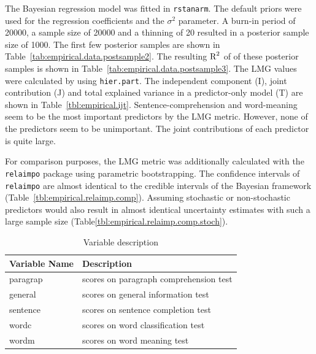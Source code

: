 \documentclass[11pt,a4paper,twoside]{book}\usepackage[]{graphicx}\usepackage[]{color}
\begin{document}
The Bayesian regression model was fitted in \texttt{rstanarm}. The default priors were used for the regression coefficients and the $\sigma^2$ parameter. A burn-in period of 20000, a sample size of 20000 and a thinning of 20 resulted in a posterior sample size of 1000. The first few posterior samples are shown in Table~\ref{tab:empirical.data.postsample2}. The resulting $\text{R}^2$ of of these posterior samples is shown in Table~\ref{tab:empirical.data.postsample3}. The LMG values were calculated by using \texttt{hier.part}. The  independent component (I), joint contribution (J) and total explained variance in a predictor-only model (T) are shown in Table~\ref{tbl:empirical.ijt}. Sentence-comprehension and word-meaning seem to be the most important predictors by the LMG metric. However, none of the predictors seem to be unimportant.  The joint contributions of each predictor is quite large.

For comparison purposes, the LMG metric was additionally calculated with the \texttt{relaimpo} package using parametric bootstrapping. The confidence intervals of  \texttt{relaimpo} are almost identical to the credible intervals of the Bayesian framework (Table~\ref{tbl:empirical.relaimp.comp}). Assuming stochastic or non-stochastic predictors would also result in almost identical uncertainty estimates with such a large sample size (Table\ref{tbl:empirical.relaimp.comp.stoch}). 







\begin{table}
\centering
\caption{Variable description}
\begin{tabular}{l l}
  \toprule			
  Variable Name & Description  \\   \midrule  
  paragrap & scores on paragraph comprehension test  \\
  general & scores on general information test \\
  sentence & scores on sentence completion test\\
  wordc & scores on word classification test \\
  wordm & scores on word meaning test \\
  \bottomrule  
\end{tabular}
\label{table:hs.data}
\end{table}
\end{document}
